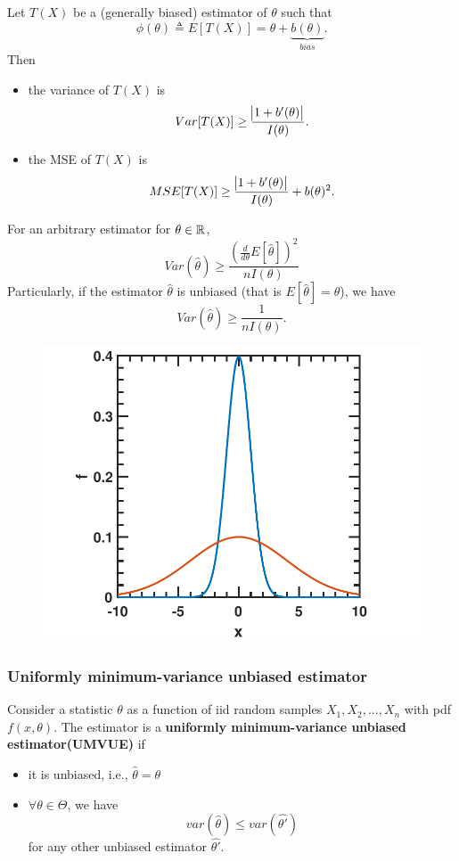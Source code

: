 \begin{refsection}
\begin{corollary}
Let $T(X)$ be a (generally biased) estimator of $\theta$ such that
$$\phi(\theta) \triangleq E[T(X)] = \theta + \underbrace{b(\theta)}_{bias}.$$
Then
\begin{itemize}
	\item the variance of $T(X)$ is
	$$Var[T(X)] \geq \frac{\abs{1 + b'(\theta)}}{I(\theta)}.$$
	\item the MSE of $T(X)$ is
	$$MSE[T(X)] \geq \frac{\abs{1 + b'(\theta)}}{I(\theta)} + b(\theta)^2.$$
\end{itemize}
\end{corollary}




\begin{theorem}
	For an arbitrary estimator for $\theta\in \mathbb{R}$, 
	$$Var(\hat{\theta}) \geq \frac{(\frac{d}{d\theta}E[\hat{\theta}])^2}{nI(\theta)}$$
	Particularly, if the estimator $\hat{\theta}$ is unbiased (that is $E[\hat{\theta}] = \theta$), we have
	$$Var(\hat{\theta}) \geq \frac{1}{nI(\theta)}.$$
\end{theorem}



\begin{figure}[H]
	\centering
	\includegraphics[width=0.5\linewidth]{../figures/statisticalModeling/estimationTheory/fisherInformationDemo}
	\caption{}
	\label{fig:fisherinformationdemo}
\end{figure}


\subsubsection{Uniformly minimum-variance unbiased estimator}
\begin{definition}
	Consider a statistic $\theta$ as a function of iid random samples $X_1,X_2,...,X_n$ with pdf $f(x,\theta)$. The estimator is a \textbf{uniformly minimum-variance unbiased estimator(UMVUE)} if 
	\begin{itemize}
		\item it is unbiased, i.e., $\hat{\theta} = \theta$
		\item $\forall \theta \in \Theta$, we have $$var(\hat{\theta}) \leq var(\hat{\theta'})$$ for any other unbiased estimator $\hat{\theta'}$.
	\end{itemize}
\end{definition}


\end{refsection}
